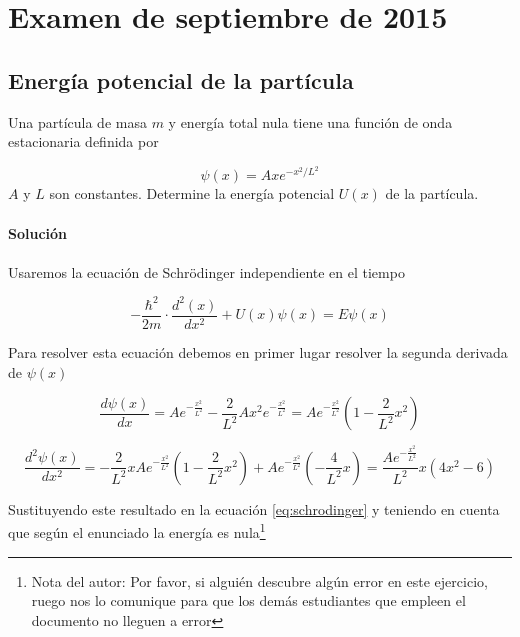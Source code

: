 \documentclass[12pt, a4paper]{article}
\begin{document}
    \section{Examen de septiembre de 2015}
    \setcounter{subsection}{0}
    \subsection{Energía potencial de la partícula}
    Una partícula de masa $m$ y energía total nula tiene una función de onda estacionaria
    definida por

    $$\psi(x)=Axe^{-x^2/L^2}$$
    $A$ y $L$ son constantes. Determine la energía potencial $U(x)$ de la partícula.

    \paragraph{\textbf{Solución}}

    \paragraph{} Usaremos la ecuación de Schrödinger independiente en el tiempo

    \begin{equation}    \label{eq:schrodinger}
        -\frac{\hbar^2}{2m}\cdot\frac{d^2(x)}{dx^2}+U(x)\psi(x)=E\psi(x)
    \end{equation}


    Para resolver esta ecuación debemos en primer lugar resolver la segunda derivada de $\psi(x)$

    $$\frac{d\psi(x)}{dx} = A e^{-\frac{x^2}{L^2}}-\frac{2}{L^2} A x^2 e^{-\frac{x^2}{L^2}} = A e^{-\frac{x^2}{L^2}}\left(1-\frac{2}{L^2}x^2\right)$$

    $$\frac{d^2\psi(x)}{dx^2} = -\frac{2}{L^2}xAe^{-\frac{x^2}{L^2}}\left(1-\frac{2}{L^2}x^2\right)+A e^{-\frac{x^2}{L^2}}\left(-\frac{4}{L^2}x\right) =
        \frac{Ae^{-\frac{x^2}{L^2}}}{L^2}x(4x^2-6)$$

    Sustituyendo este resultado en la ecuación \ref{eq:schrodinger} y teniendo en cuenta que según el enunciado la energía es nula\footnote{Nota
    del autor: Por favor, si alguién descubre algún error en este ejercicio, ruego nos lo comunique para que los demás estudiantes
    que empleen el documento no lleguen a error}
\end{document}
